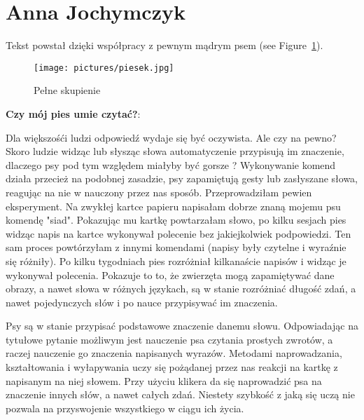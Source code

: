 \section{Anna Jochymczyk}
\label{sec:ania}

Tekst powstał dzięki współpracy z pewnym mądrym psem (see Figure~\ref{fig:piesek}).

\begin{figure}[htbp] 
    \centering
    \texttt{[image: pictures/piesek.jpg]} 
    
    \caption{Pełne skupienie}
    \label{fig:piesek}
\end{figure}

\textbf{{\large Czy mój pies umie czytać?}}:

\vspace {0.51cm}
\maketitle
    

    Dla większośći ludzi odpowiedź wydaje się być oczywista. Ale czy na pewno? Skoro ludzie widząc lub słysząc słowa automatyczenie przypisują im znaczenie, dlaczego psy pod tym względem miałyby być gorsze ? Wykonywanie komend działa przecież na podobnej zasadzie, psy zapamiętują gesty lub zasłyszane słowa, reagując na nie w nauczony przez nas sposób. Przeprowadziłam pewien eksperyment. Na zwykłej kartce papieru napisałam dobrze znaną mojemu psu komendę "siad". Pokazując mu kartkę powtarzałam słowo, po kilku sesjach pies widząc napis na kartce wykonywał polecenie bez jakiejkolwiek podpowiedzi. Ten sam proces powtórzyłam z innymi komendami (napisy były czytelne i wyraźnie się różniły). Po kilku tygodniach pies rozróżniał kilkanaście napisów i widząc je wykonywał polecenia.     Pokazuje to to, że zwierzęta mogą zapamiętywać dane obrazy, a nawet słowa w różnych językach, są w stanie rozróżniać długość zdań, a nawet pojedynczych słów i po nauce przypisywać im znaczenia. 
\vspace {0.51cm}

\maketitle    Psy są w stanie przypisać podstawowe znaczenie danemu słowu. Odpowiadając na tytułowe pytanie możliwym jest nauczenie psa czytania prostych zwrotów, a raczej nauczenie go znaczenia napisanych wyrazów.  Metodami naprowadzania, kształtowania i wyłapywania  uczy się pożądanej przez nas reakcji na kartkę z napisanym na niej słowem. Przy użyciu klikera da się naprowadzić psa na znaczenie innych słów, a nawet całych zdań. Niestety szybkość z jaką się uczą nie pozwala na przyswojenie wszystkiego w ciągu ich życia.




